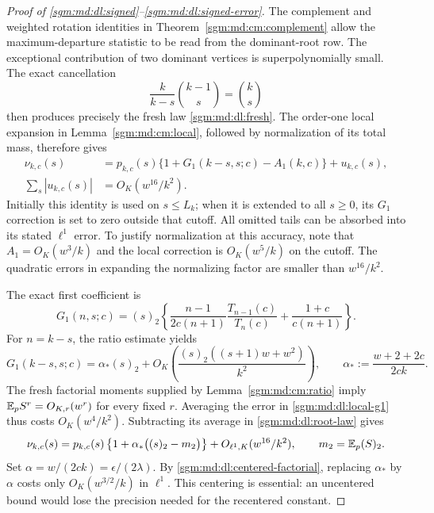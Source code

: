 \documentclass[11pt,letterpaper]{article}
\theoremstyle{remark}\newtheorem{remark}[theorem]{Remark}
\newcommand{\fall}[2]{(#1)_{#2}}\newcommand{\rise}[2]{#1^{\overline{#2}}}
\theoremstyle{definition}\newtheorem{definition}[theorem]{Definition}
\begin{document}
\begin{proof}[Proof of \eqref{sgm:md:dl:signed}--\eqref{sgm:md:dl:signed-error}]
The complement and weighted rotation identities in
Theorem~\ref{sgm:md:cm:complement} allow the maximum-departure statistic to be
read from the dominant-root row.  The exceptional contribution of two
dominant vertices is superpolynomially small.  The exact cancellation
\[
 \frac{k}{k-s}\binom{k-1}{s}=\binom{k}{s}
\]
then produces precisely the fresh law \eqref{sgm:md:dl:fresh}.
The order-one local expansion in Lemma~\ref{sgm:md:cm:local}, followed by
normalization of its total mass, therefore gives
\begin{align}
 \nu_{k,c}(s)
 &=p_{k,c}(s)\{1+G_1(k-s,s;c)-A_1(k,c)\}+u_{k,c}(s),
 \label{sgm:md:dl:root-law}\\
 \sum_s|u_{k,c}(s)|&=O_K(w^{16}/k^2).
\end{align}
Initially this identity is used on $s\le L_k$; when it is extended to
all $s\ge0$, its $G_1$ correction is set to zero outside that cutoff.
All omitted tails can be absorbed into its stated $\ell^1$ error.
To justify normalization at this
accuracy, note that $A_1=O_K(w^3/k)$ and the local correction is
$O_K(w^5/k)$ on the cutoff.  The quadratic errors in expanding the
normalizing factor are smaller than $w^{16}/k^2$.

The exact first coefficient is
\[
 G_1(n,s;c)=\fall{s}{2}\left\{
   \frac{n-1}{2c(n+1)}\frac{T_{n-1}(c)}{T_n(c)}
                      +\frac{1+c}{c(n+1)}\right\}.
\]
For $n=k-s$, the ratio estimate yields
\begin{equation}\label{sgm:md:dl:local-g1}
 G_1(k-s,s;c)=\alpha_*\fall{s}{2}
 +O_K\!\left(
  \frac{\fall{s}{2}((s+1)w+w^2)}{k^2}\right),
 \qquad \alpha_*:=\frac{w+2+2c}{2ck}.
\end{equation}
The fresh factorial moments supplied by Lemma~\ref{sgm:md:cm:ratio} imply
$\mathbb E_p S^r=O_{K,r}(w^r)$ for every fixed $r$.
Averaging the error in \eqref{sgm:md:dl:local-g1} thus costs
$O_K(w^4/k^2)$.  Subtracting its average in \eqref{sgm:md:dl:root-law} gives
\[
 \nu_{k,c}(s)=p_{k,c}(s)
       \left\{1+\alpha_*\bigl(\fall{s}{2}-m_2\bigr)\right\}
           +O_{\ell^1,K}(w^{16}/k^2),
 \qquad m_2=\E_p\fall{S}{2}.
\]
Set $\alpha=w/(2ck)=\epsilon/(2\lambda)$.
By \eqref{sgm:md:dl:centered-factorial}, replacing $\alpha_*$ by $\alpha$
costs only $O_K(w^{3/2}/k)$ in $\ell^1$.
This centering is essential: an uncentered bound would lose the precision
needed for the recentered constant.


\end{proof}
\end{document}
